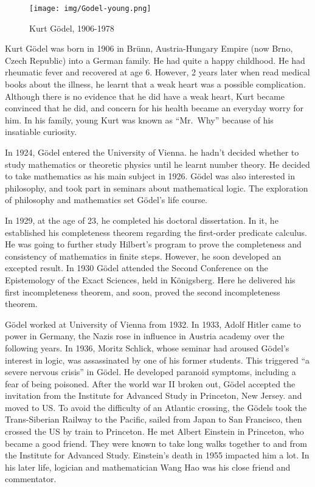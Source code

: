 \documentclass[b5paper]{article}
\begin{document}
\begin{wrapfigure}{L}{0.4\textwidth}
 \centering
 \texttt{[image: img/Godel-young.png]}
 \captionsetup{labelformat=empty}
 \caption{Kurt Gödel, 1906-1978}
 \label{fig:Godel-young}
\end{wrapfigure}

Kurt Gödel was born in 1906 in Brünn, Austria-Hungary Empire (now Brno, Czech Republic) into a German family. He had quite a happy childhood. He had rheumatic fever and recovered at age 6. However, 2 years later when read medical books about the illness, he learnt that a weak heart was a possible complication. Although there is no evidence that he did have a weak heart, Kurt became convinced that he did, and concern for his health became an everyday worry for him. In his family, young Kurt was known as ``Mr.\ Why'' because of his insatiable curiosity.

In 1924, Gödel entered the University of Vienna. he hadn't decided whether to study mathematics or theoretic physics until he learnt number theory. He decided to take mathematics as his main subject in 1926. Gödel was also interested in philosophy, and took part in seminars about mathematical logic. The exploration of philosophy and mathematics set Gödel's life course.

In 1929, at the age of 23, he completed his doctoral dissertation. In it, he established his completeness theorem regarding the first-order predicate calculus. He was going to further study Hilbert's program to prove the completeness and consistency of mathematics in finite steps. However, he soon developed an excepted result. In 1930 Gödel attended the Second Conference on the Epistemology of the Exact Sciences, held in Königsberg. Here he delivered his first incompleteness theorem, and soon, proved the second incompleteness theorem.

Gödel worked at University of Vienna from 1932. In 1933, Adolf Hitler came to power in Germany, the Nazis rose in influence in Austria academy over the following years. In 1936, Moritz Schlick, whose seminar had aroused Gödel's interest in logic, was assassinated by one of his former students. This triggered ``a severe nervous crisis'' in Gödel. He developed paranoid symptoms, including a fear of being poisoned. After the world war II broken out, Gödel accepted the invitation from the Institute for Advanced Study in Princeton, New Jersey. and moved to US. To avoid the difficulty of an Atlantic crossing, the Gödels took the Trans-Siberian Railway to the Pacific, sailed from Japan to San Francisco, then crossed the US by train to Princeton. He met Albert Einstein in Princeton, who became a good friend. They were known to take long walks together to and from the Institute for Advanced Study. Einstein's death in 1955 impacted him a lot. In his later life, logician and mathematician Wang Hao was his close friend and commentator.
\end{document}
